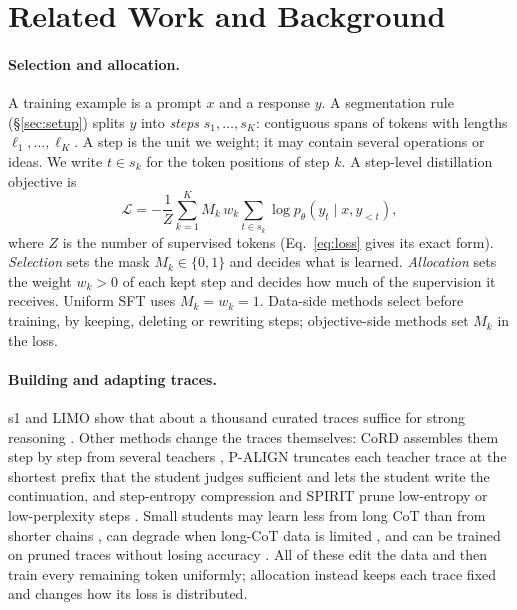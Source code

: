 \documentclass[11pt]{article}
\begin{document}
\section{Related Work and Background}
\label{sec:related}

\paragraph{Selection and allocation.}
\label{sec:selection}
A training example is a prompt $x$ and a response $y$.
A segmentation rule (\S\ref{sec:setup}) splits $y$ into \emph{steps} $s_1,\dots,s_K$: contiguous spans of tokens with lengths $\ell_1,\dots,\ell_K$.
A step is the unit we weight; it may contain several operations or ideas.
We write $t\in s_k$ for the token positions of step $k$.
A step-level distillation objective is
\begin{equation}
  \mathcal{L}=-\frac{1}{Z}\sum_{k=1}^{K} M_k\,w_k\sum_{t\in s_k}\log p_\theta(y_t\mid x,y_{<t}),
  \label{eq:iwc}
\end{equation}
where $Z$ is the number of supervised tokens (Eq.~\ref{eq:loss} gives its exact form).
\emph{Selection} sets the mask $M_k\in\{0,1\}$ and decides what is learned.
\emph{Allocation} sets the weight $w_k>0$ of each kept step and decides how much of the supervision it receives.
Uniform SFT uses $M_k=w_k=1$.
Data-side methods select before training, by keeping, deleting or rewriting steps; objective-side methods set $M_k$ in the loss.

\paragraph{Building and adapting traces.}
s1 and LIMO show that about a thousand curated traces suffice for strong reasoning \citep{muennighoff2025s1,ye2025limo}.
Other methods change the traces themselves: CoRD assembles them step by step from several teachers \citep{yun2026cord}, P-ALIGN \citep{liu2026palign} truncates each teacher trace at the shortest prefix that the student judges sufficient and lets the student write the continuation, and step-entropy compression and SPIRIT prune low-entropy or low-perplexity steps \citep{li2026stepentropy,cui2025spirit}.
Small students may learn less from long CoT than from shorter chains \citep{li2025smallstruggle}, can degrade when long-CoT data is limited \citep{luo2025valley}, and can be trained on pruned traces without losing accuracy \citep{wang2025efficientlong}.
All of these edit the data and then train every remaining token uniformly; allocation instead keeps each trace fixed and changes how its loss is distributed.
\end{document}
